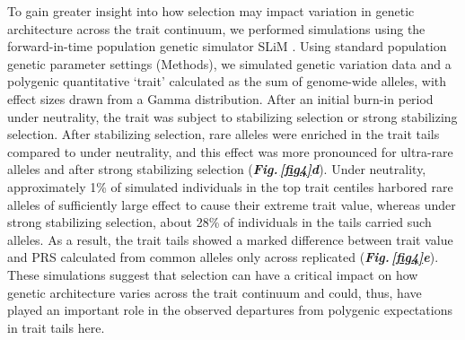 \documentclass[12pt]{zHenriquesLab-StyleBioRxiv}
\newcommand\dref[2]{\normalsize{\textbf{\textit{Fig.\,\ref{#1}#2}}}\normalsize{}}
\begin{document}
To gain greater insight into how selection may impact variation 
in genetic architecture across the trait continuum, we 
performed simulations using the forward-in-time population 
genetic simulator SLiM \cite{BC_2019}. Using standard population 
genetic parameter settings (Methods), we simulated genetic variation 
data and a polygenic quantitative ‘trait’ calculated as the sum of genome-wide alleles, 
with effect sizes drawn from a Gamma distribution. After an initial 
burn-in period under neutrality, the trait was subject to stabilizing selection or strong 
stabilizing selection. After stabilizing selection, rare alleles 
were enriched in the trait tails compared to under neutrality, 
and this effect was more pronounced for ultra-rare alleles and 
after strong stabilizing selection (\dref{fig4}{d}). Under 
neutrality, approximately 1\% of simulated individuals in the 
top trait centiles harbored rare alleles of sufficiently large 
effect to cause their extreme trait value, whereas under strong
stabilizing selection, about 28\% of individuals in the tails 
carried such alleles. As a result, the trait tails showed a marked 
difference between trait value and PRS calculated from common alleles 
only across replicated (\dref{fig4}{e}). These simulations 
suggest that selection can have a critical impact on how genetic 
architecture varies across the trait continuum and could, thus, 
have played an important role in the observed departures from 
polygenic expectations in trait tails here.
\end{document}
